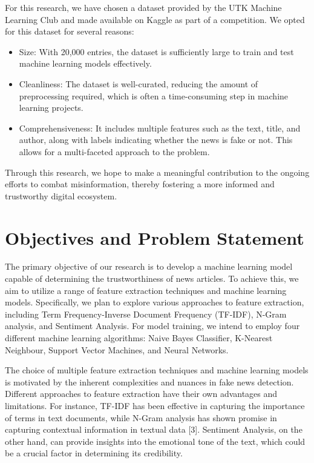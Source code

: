 \documentclass[12pt,a4paper]{article}
\begin{document}
For this research, we have chosen a dataset provided by the UTK Machine Learning Club and made available on Kaggle as part of a competition. We opted for this dataset for several reasons:
\begin{itemize}
	\item \textsf{Size}: With 20,000 entries, the dataset is sufficiently large to train and test machine learning models effectively.
	\item \textsf{Cleanliness}: The dataset is well-curated, reducing the amount of preprocessing required, which is often a time-consuming step in machine learning projects.
	\item \textsf{Comprehensiveness}: It includes multiple features such as the text, title, and author, along with labels indicating whether the news is fake or not. This allows for a multi-faceted approach to the problem.
\end{itemize}

Through this research, we hope to make a meaningful contribution to the ongoing efforts to combat misinformation, thereby fostering a more informed and trustworthy digital ecosystem.
	\section{Objectives and Problem Statement}\label{sec:prob}
	The primary objective of our research is to develop a machine learning model capable of determining the trustworthiness of news articles. To achieve this, we aim to utilize a range of feature extraction techniques and machine learning models. Specifically, we plan to explore various approaches to feature extraction, including Term Frequency-Inverse Document Frequency (TF-IDF), N-Gram analysis, and Sentiment Analysis. For model training, we intend to employ four different machine learning algorithms: Naive Bayes Classifier, K-Nearest Neighbour, Support Vector Machines, and Neural Networks.

	The choice of multiple feature extraction techniques and machine learning models is motivated by the inherent complexities and nuances in fake news detection. Different approaches to feature extraction have their own advantages and limitations. For instance, TF-IDF has been effective in capturing the importance of terms in text documents, while N-Gram analysis has shown promise in capturing contextual information in textual data [3]. Sentiment Analysis, on the other hand, can provide insights into the emotional tone of the text, which could be a crucial factor in determining its credibility.
\end{document}
